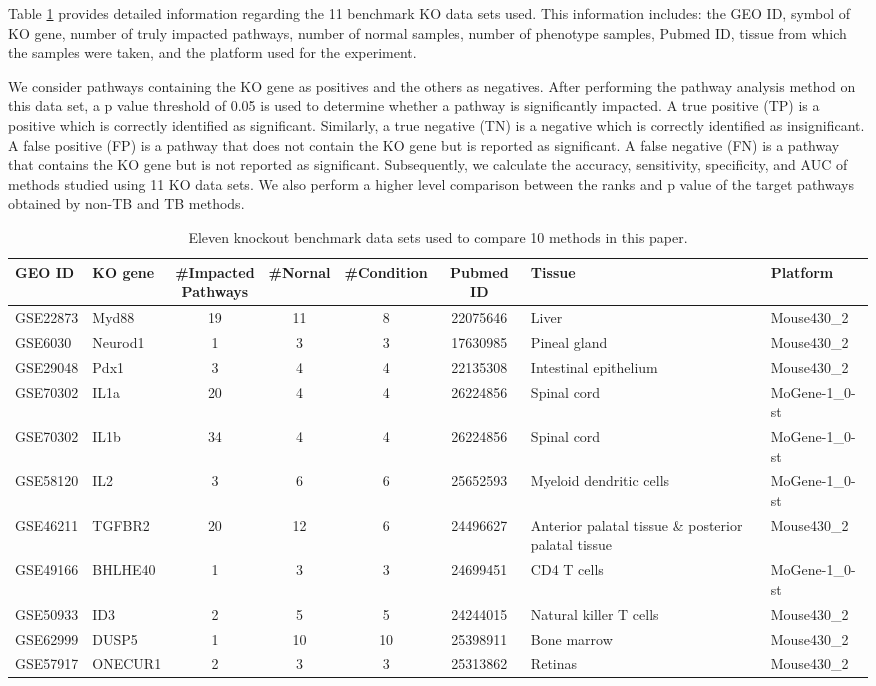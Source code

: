Table \ref{table:MouseDatasets} provides detailed information regarding the 11 benchmark KO data sets used. This information includes:  the GEO ID, symbol of KO gene, number of truly impacted pathways, number of normal samples, number of phenotype samples, Pubmed ID, tissue from which the samples were taken, and the platform used for the experiment.


We consider pathways containing the KO gene as positives and the others as negatives. After performing the pathway analysis method on this data set, a p value threshold of 0.05 is used to determine whether a pathway is significantly impacted. A true positive (TP) is a positive which is correctly identified as significant. 
Similarly, a true negative (TN) is a negative which is correctly identified as insignificant.
A false positive (FP) is a pathway that does not contain the KO gene but is reported as significant. A false negative (FN) is a pathway that contains the KO gene but is not reported as significant.
Subsequently, we calculate the accuracy, sensitivity, specificity, and AUC of methods studied using 11 KO data sets. 
We also perform a higher level comparison between the ranks and p value of the target pathways obtained by non-TB and TB methods.


\begin{landscape}
\setlength\LTleft{0pt}            %
\setlength\LTright{0pt}           %
\centering
\small
\begin{longtable}{@{}llccccll@{}}
\caption{Eleven knockout benchmark data sets used to compare 10 methods in this paper.\label{table:MouseDatasets}}\\
\hline
 \textbf{GEO ID}& \textbf{KO gene} & \makecell{\textbf{\#Impacted} \\\textbf{Pathways} }& \textbf{\#Nornal} & \textbf{\#Condition}& \textbf{Pubmed ID} & \textbf{Tissue} & \textbf{Platform}  \\
 \hline
 GSE22873	&Myd88	&19	&11	&8	&22075646	&Liver	&Mouse430\_2 \\
GSE6030	&Neurod1	&1	&3	&3	&17630985	&Pineal gland	&Mouse430\_2 \\
GSE29048	&Pdx1	&3	&4	&4	&22135308	&Intestinal epithelium	&Mouse430\_2\\
GSE70302	&IL1a	&20	&4	&4	&26224856	&Spinal cord	&MoGene-1\_0-st\\
GSE70302	&IL1b	&34	&4	&4	&26224856	&Spinal cord	&MoGene-1\_0-st\\
GSE58120	&IL2	&3	&6	&6	&25652593	&Myeloid dendritic cells	&MoGene-1\_0-st\\
GSE46211	&TGFBR2	&20	&12	&6	&24496627	&Anterior palatal tissue \& posterior palatal tissue	&Mouse430\_2\\
GSE49166	&BHLHE40	&1	&3	&3	&24699451	&CD4 T cells	&MoGene-1\_0-st\\
GSE50933	&ID3		&2	&5	&5	&24244015	&Natural killer T cells	&Mouse430\_2\\
GSE62999	&DUSP5	&1	&10	&10	&25398911	&Bone marrow	&Mouse430\_2\\
GSE57917	&ONECUR1	&2	&3	&3	&25313862	&Retinas	&Mouse430\_2\\
\hline
 \end{longtable}
\end{landscape}

